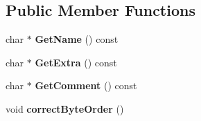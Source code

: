 \subsection*{Public Member Functions}
\begin{DoxyCompactItemize}
\item 
char $\ast$ {\bfseries Get\+Name} () const \hypertarget{structCPK3_1_1TZipDirFileHeader_a8722a86a2dfda1d245cc45c57f47f8f5}{}\label{structCPK3_1_1TZipDirFileHeader_a8722a86a2dfda1d245cc45c57f47f8f5}

\item 
char $\ast$ {\bfseries Get\+Extra} () const \hypertarget{structCPK3_1_1TZipDirFileHeader_a7e73780147491a78a24eff736bc990e9}{}\label{structCPK3_1_1TZipDirFileHeader_a7e73780147491a78a24eff736bc990e9}

\item 
char $\ast$ {\bfseries Get\+Comment} () const \hypertarget{structCPK3_1_1TZipDirFileHeader_a1801da952e34ae8a8afe9e857e609705}{}\label{structCPK3_1_1TZipDirFileHeader_a1801da952e34ae8a8afe9e857e609705}

\item 
void {\bfseries correct\+Byte\+Order} ()\hypertarget{structCPK3_1_1TZipDirFileHeader_a513a6b7aa2a44a4722a8bbcc886458ea}{}\label{structCPK3_1_1TZipDirFileHeader_a513a6b7aa2a44a4722a8bbcc886458ea}

\end{DoxyCompactItemize}
